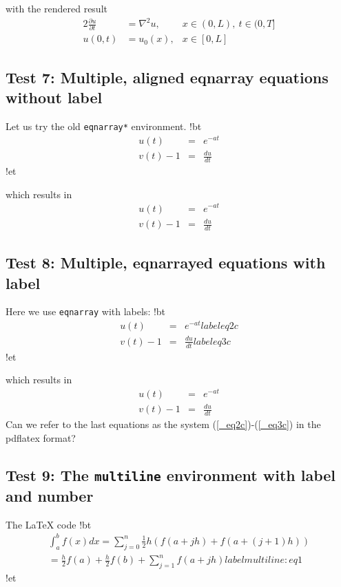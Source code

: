 \documentclass[%
oneside,                 %
final,                   %
10pt]{article}
\begin{document}
\elatexcod

with the rendered result
\begin{alignat}{2}
\frac{\partial u}{\partial t} &= \nabla^2 u, & x\in (0,L),
\ t\in (0,T]\\ 
u(0,t) &= u_0(x), & x\in [0,L]
\end{alignat}
\subsection{Test 7: Multiple, aligned eqnarray equations without label}
Let us try the old \texttt{eqnarray*} environment.
\blatexcod
!bt
\begin{eqnarray*}
u(t)&=& e^{-at}\\ 
v(t) - 1 &=& \frac{du}{dt}
\end{eqnarray*}
!et

\elatexcod

which results in
\begin{eqnarray*}
u(t)&=& e^{-at}\\ 
v(t) - 1 &=& \frac{du}{dt}
\end{eqnarray*}
\subsection{Test 8: Multiple, eqnarrayed equations with label}
Here we use \texttt{eqnarray} with labels:
\blatexcod
!bt
\begin{eqnarray}
u(t)&=& e^{-at}
label{eq2c}\\ 
v(t) - 1 &=& \frac{du}{dt}
label{eq3c}
\end{eqnarray}
!et

\elatexcod

which results in
\begin{eqnarray}
u(t)&=& e^{-at} \label{_eq2c}\\ 
v(t) - 1 &=& \frac{du}{dt} \label{_eq3c}
\end{eqnarray}
Can we refer to the last equations as the system (\ref{_eq2c})-(\ref{_eq3c})
in the pdflatex format?
\subsection{Test 9: The \texttt{multiline} environment with label and number}
The {\LaTeX} code
\blatexcod
!bt
\begin{multline}
\int_a^b f(x)dx = \sum_{j=0}^{n} \frac{1}{2} h(f(a+jh) +
f(a+(j+1)h)) \\ 
=\frac{h}{2}f(a) + \frac{h}{2}f(b) + \sum_{j=1}^n f(a+jh)
label{multiline:eq1}
\end{multline}
!et
\end{document}
